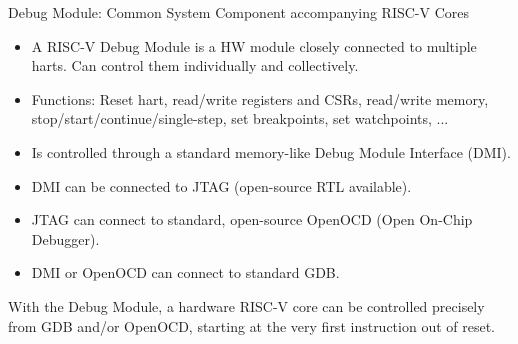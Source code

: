 \documentclass{article}
\begin{document}
\begin{center}
  {\Huge
    Debug Module: Common System Component accompanying RISC-V Cores}

  \vspace*{0.2in}


  \vspace*{0.3in}

  \begin{minipage}[t]{9in}
    \begin{itemize}\Large

    \item A RISC-V Debug Module is a HW module closely connected to
      multiple harts.  Can control them individually and collectively.

    \item Functions: Reset hart, read/write registers and CSRs,
      read/write memory, stop/start/continue/single-step, set
      breakpoints, set watchpoints, ...

    \item Is controlled through a standard memory-like Debug Module
      Interface (DMI).

    \item DMI can be connected to JTAG (open-source RTL available).

    \item JTAG can connect to standard, open-source OpenOCD (Open On-Chip Debugger).

    \item DMI or OpenOCD can connect to standard GDB.
    \end{itemize}

    \vspace{1ex}

    {\Large With the Debug Module, a hardware RISC-V core can be
      controlled precisely from GDB and/or OpenOCD, starting at the
      very first instruction out of reset.}
  \end{minipage}
\end{center}
\end{document}
